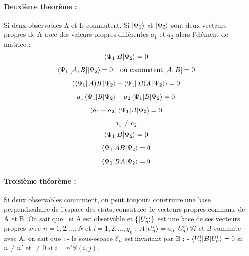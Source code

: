 \documentclass[12pt,a4paper,titlepage]{book}
\begin{document}
\paragraph*{Deuxième théorème :}

Si deux observables A et B commutent. Si $\ket{\Psi_1}$ et $\ket{\Psi_2}$ sont deux vecteurs propres de A avec des valeurs propres différentes $a_1$ et $a_2$ alors l'élément de matrice :
\begin{equation*}
\braket{\Psi_1 | B | \Psi_2} = 0
\end{equation*}
\begin{equation*}
\braket{\Psi_1 | [A,B] | \Psi_2} = 0 ~;~ \text{où commutent}~ [A,B] = 0
\end{equation*}
\begin{equation*}
(\bra{\Psi_1} A) B\ket{\Psi_2} - \bra{\Psi_1} B (A \ket{\Psi_2}) = 0
\end{equation*}
\begin{equation*}
a_1 \braket{\Psi_1 | B | \Psi_2} - a_2 \braket{\Psi_1 | B | \Psi_2} = 0
\end{equation*}
\begin{equation*}
(a_1 - a_2) \braket{\Psi_1 | B | \Psi_2} = 0
\end{equation*}
\begin{equation*}
a_1 \neq a_2
\end{equation*}
\begin{equation*}
\braket{\Psi_1 | B | \Psi_2} = 0
\end{equation*}
\begin{equation*}
\braket{\Psi_1 | AB | \Psi_2} = 0
\end{equation*}
\begin{equation*}
\braket{\Psi_1 | BA | \Psi_2} = 0
\end{equation*}

\paragraph*{Troisième théorème :}

Si deux observables commutent, on peut toujours construire une base perpendiculaire de l'espace des états, constituée de vecteurs propres communs de A et B. On sait que : si A est observable et $\lbrace \ket{U_n^i} \rbrace$ est une base de ses vecteurs propres avec $n = 1, 2, \ldots, N$ et $i = 1, 2, \ldots, g_n$ ; $A \ket{U_n^i} = a_n \ket{U_n^i} \forall i$ et B commute avec A, on sait que : - le sous-espace $\mathcal{E}_n$ est invariant par B ; - $\braket{V_n^i | B | U_n^i} = 0$ si $n \neq n'$ et $\neq 0$ si $i = n' \forall (i, j)$. \\
\end{document}
